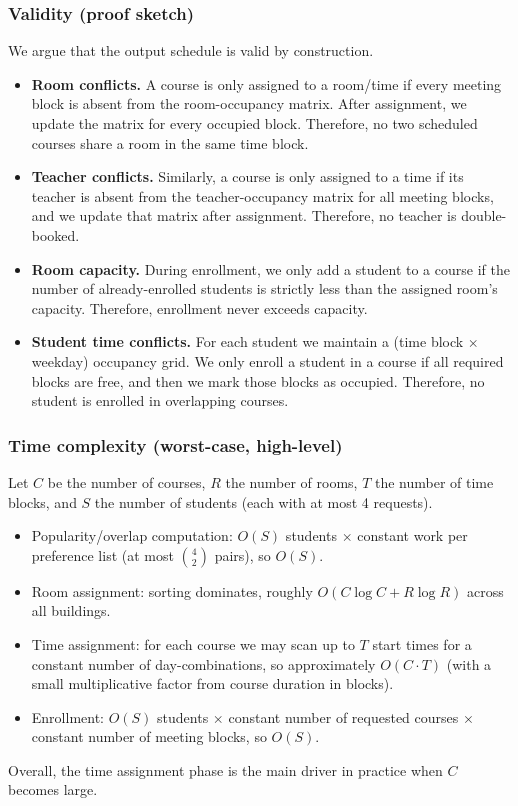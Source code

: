 \subsubsection*{Validity (proof sketch)}
We argue that the output schedule is valid by construction.
\begin{itemize}
  \item \textbf{Room conflicts.} A course is only assigned to a room/time if every meeting block is absent from the room-occupancy matrix. After assignment, we update the matrix for every occupied block. Therefore, no two scheduled courses share a room in the same time block.
  \item \textbf{Teacher conflicts.} Similarly, a course is only assigned to a time if its teacher is absent from the teacher-occupancy matrix for all meeting blocks, and we update that matrix after assignment. Therefore, no teacher is double-booked.
  \item \textbf{Room capacity.} During enrollment, we only add a student to a course if the number of already-enrolled students is strictly less than the assigned room’s capacity. Therefore, enrollment never exceeds capacity.
  \item \textbf{Student time conflicts.} For each student we maintain a (time block $\times$ weekday) occupancy grid. We only enroll a student in a course if all required blocks are free, and then we mark those blocks as occupied. Therefore, no student is enrolled in overlapping courses.
\end{itemize}

\subsubsection*{Time complexity (worst-case, high-level)}
Let $C$ be the number of courses, $R$ the number of rooms, $T$ the number of time blocks, and $S$ the number of students (each with at most 4 requests).
\begin{itemize}
  \item Popularity/overlap computation: $O(S)$ students $\times$ constant work per preference list (at most $\binom{4}{2}$ pairs), so $O(S)$.
  \item Room assignment: sorting dominates, roughly $O(C\log C + R\log R)$ across all buildings.
  \item Time assignment: for each course we may scan up to $T$ start times for a constant number of day-combinations, so approximately $O(C \cdot T)$ (with a small multiplicative factor from course duration in blocks).
  \item Enrollment: $O(S)$ students $\times$ constant number of requested courses $\times$ constant number of meeting blocks, so $O(S)$.
\end{itemize}
Overall, the time assignment phase is the main driver in practice when $C$ becomes large.

